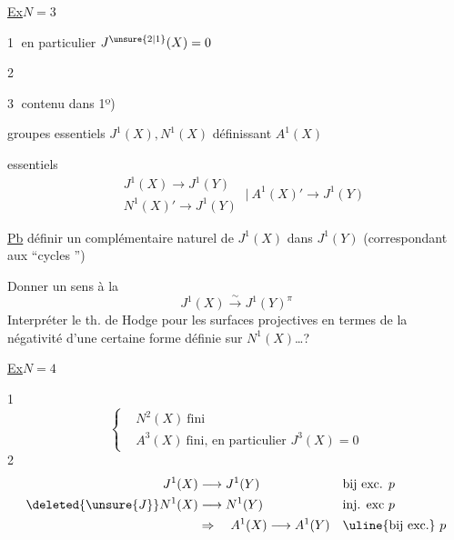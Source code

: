 \uline{Ex}\quad $N=3$

\textcircled{1}\quad {} \quad en particulier $J^{\unsure{2|1}}(X)=0$

\textcircled{2}\quad {}

\textcircled{3}\quad {} contenu dans 1º)

groupes essentiels \quad $J^1(X),N^1(X)$ \qquad définissant $A^1(X)$

 essentiels
\[
\begin{aligned}
 &J^1(X)\longrightarrow J^1(Y)\\
 &N^1(X)'\longrightarrow J^1(Y)
\end{aligned}\ \bigg|\ A^1(X)'\longrightarrow J^1(Y)
\]

\uline{Pb} définir un complémentaire naturel de $J^1(X)$ dans $J^1(Y)$ (correspondant aux ``cycles '')

Donner un sens à la 
\[
 J^1(X)\overset{\sim}{\longrightarrow}J^1(Y)^{\pi}
\]
Interpréter le th. de  Hodge pour les surfaces projectives en termes de la négativité d'une certaine forme définie sur $N^1(X)$\ldots?

\uline{Ex}\quad $N=4$

\textcircled{1}
\[
 \left\{\begin{aligned}
 &N^2(X)\ \text{fini}\\
 &A^3(X)\ \text{fini, en particulier }J^3(X)=0
 \end{aligned}\right.
\]
\textcircled{2}
\[
\begin{aligned}
 J^1(X)&\longrightarrow J^1(Y)&&\text{bij exc. $p$}\\
 \deleted{\unsure{J}}N^1(X)&\longrightarrow N^1(Y)&&\text{inj. exc $p$}\\
 &\Rightarrow\quad A^1(X)\longrightarrow A^1(Y)&&\text{\uline{bij exc.} $p$}
\end{aligned}
\]
